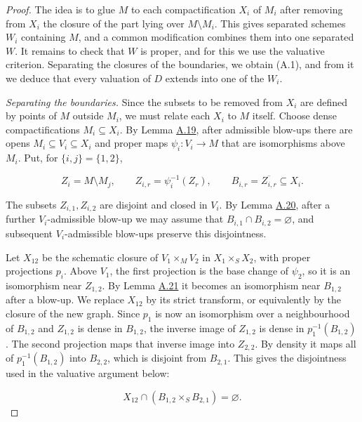 \documentclass[11pt]{article}
\begin{document}
\begin{proof}[{Proof}]\label{bp62}%
The idea is to glue \(M\) to each compactification \(X_i\) of \(M_i\) after removing from \(X_i\) the closure of the part lying over \(M\setminus M_i\). This gives separated schemes \(W_i\) containing \(M\), and a common modification combines them into one separated \(W\). It remains to check that \(W\) is proper, and for this we use the valuative criterion. Separating the closures of the boundaries, we obtain (A.1), and from it we deduce that every valuation of \(D\) extends into one of the \(W_i\).

\emph{Separating the boundaries.} Since the subsets to be removed from \(X_i\) are defined by points of \(M\) outside \(M_i\), we must relate each \(X_i\) to \(M\) itself. Choose dense compactifications \(M_i\subseteq X_i\). By Lemma \hyperref[bp49]{A.19}, after admissible blow-ups there are opens \(M_i\subseteq V_i\subseteq X_i\) and proper maps \(\psi_i:V_i\to M\) that are isomorphisms above \(M_i\). Put, for \(\{i,j\}=\{1,2\}\),

\[
Z_i=M\setminus M_j,\qquad
Z_{i,r}=\psi_i^{-1}(Z_r),\qquad
B_{i,r}=\overline{Z_{i,r}}\subseteq X_i.
\]

The subsets \(Z_{i,1},Z_{i,2}\) are disjoint and closed in \(V_i\). By Lemma \hyperref[bp53]{A.20}, after a further \(V_i\)-admissible blow-up we may assume that \(B_{i,1}\cap B_{i,2}=\varnothing\), and subsequent \(V_i\)-admissible blow-ups preserve this disjointness.

Let \(X_{12}\) be the schematic closure of \(V_1\times_MV_2\) in \(X_1\times_SX_2\), with proper projections \(p_i\). Above \(V_1\), the first projection is the base change of \(\psi_2\), so it is an isomorphism near \(Z_{1,2}\). By Lemma \hyperref[bp55]{A.21} it becomes an isomorphism near \(B_{1,2}\) after a blow-up. We replace \(X_{12}\) by its strict transform, or equivalently by the closure of the new graph. Since \(p_1\) is now an isomorphism over a neighbourhood of \(B_{1,2}\) and \(Z_{1,2}\) is dense in \(B_{1,2}\), the inverse image of \(Z_{1,2}\) is dense in \(p_1^{-1}(B_{1,2})\). The second projection maps that inverse image into \(Z_{2,2}\). By density it maps all of \(p_1^{-1}(B_{1,2})\) into \(B_{2,2}\), which is disjoint from \(B_{2,1}\). This gives the disjointness used in the valuative argument below:

\[
X_{12}\cap(B_{1,2}\times_SB_{2,1})=\varnothing.
\tag{A.1}
\]


\end{proof}
\end{document}
